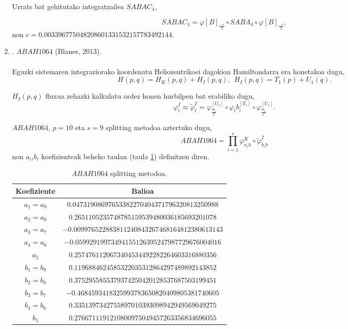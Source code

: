 \begin{enumerate}
Urrats bat gehitutako integratzailea $SABAC_4$,

\begin{equation*}
SABAC_4=\varphi{[B]}_\frac{-c}{2} \circ SABA_4 \circ \varphi{[B]}_\frac{-c}{2},
\end{equation*}
non $c=0.003396775048208601331532157783492144$.\\

\item. $ABAH1064$ (Blanes, 2013).

\paragraph*{}Eguzki sistemaren integraziorako koordenatu Heliozentrikoei dagokion Hamiltondarra era honetakoa dugu,
\begin{equation*}
H(p,q)=H_K(p,q)+H_I(p,q), \ \ H_I(p,q)=T_1(p)+U_1(q). 
\end{equation*}

$H_I(p,q)$ fluxua zehazki kalkulatu ordez honen hurbilpen bat erabiliko dugu,
\begin{equation*}
\varphi_t^I \approx \tilde{\varphi}_t^I= \varphi_{\frac{tb_i}{2}}^{[U_1]} \circ \varphi_tb_i^{[T_1]} \circ \varphi_{\frac{tb_i}{2}}^{[U_1]}.
\end{equation*}

$ABAH1064$, $p=10$ eta $s=9$ splitting metodoa aztertuko dugu,
\begin{equation*}
ABAH1064=\prod\limits_{i=1}^{s} \varphi_{a_ih}^K \circ \tilde{\varphi}_{b_ih}^I
\end{equation*}
non $a_i$,$b_i$ koefizienteak beheko taulan (taula \ref{tab:33}) definitzen diren.  

\begin{table}
\caption[$ABAH1064$ splitting metodoa.] 
{\small{$ABAH1064$ splitting metodoa.}}
\label{tab:33}       %
\begin{tabular}{ c c } 
 \hline
 Koefiziente         &  Balioa \\
 \hline
 $a_1=a_9$ & $0.04731908697653382270404371796320813250988$ \\
 $a_2=a_8$ & $0.2651105235748785159539480036185693201078$ \\
 $a_3=a_7$ & $-0.009976522883811240843267468164812380613143$ \\
 $a_4=a_6$ & $-0.05992919973494155126395247987729676004016$ \\
 $a_5$ & $0.2574761120673404534492282264603316880356$ \\
 $b_1=b_9$ & $0.1196884624585322035312864297489892143852$ \\
 $b_2=b_8$ & $0.3752955855379374250420128537687503199451$ \\
 $b_3=b_7$ & $-0.4684593418325993783650820409805381740605$ \\
 $b_4=b_6$ & $0.3351397342755897010393098942949569049275$ \\
 $b_5$ &  $0.2766711191210800975049457263356834696055$ \\
  \hline
 \end{tabular}
\end{table}

\end{enumerate} 


